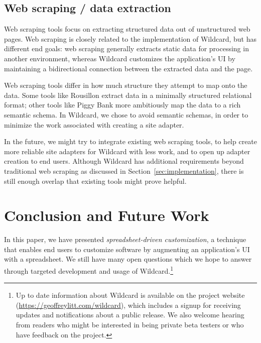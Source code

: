 \documentclass[english]{programming}
\begin{document}
\hypertarget{web-scraping-data-extraction}{%
\subsection{Web scraping / data
extraction}\label{web-scraping-data-extraction}}

Web scraping tools focus on extracting structured data out of
unstructured web pages. Web scraping is closely related to the
implementation of Wildcard, but has different end goals: web scraping
generally extracts static data for processing in another environment,
whereas Wildcard customizes the application's UI by maintaining a
bidirectional connection between the extracted data and the page.

Web scraping tools differ in how much structure they attempt to map onto
the data. Some tools like Rousillon \autocite{chasins2018} extract data
in a minimally structured relational format; other tools like Piggy Bank
\autocite{huynh2005} more ambitiously map the data to a rich semantic
schema. In Wildcard, we chose to avoid semantic schemas, in order to
minimize the work associated with creating a site adapter.

In the future, we might try to integrate existing web scraping tools, to
help create more reliable site adapters for Wildcard with less work, and
to open up adapter creation to end users. Although Wildcard has
additional requirements beyond traditional web scraping as discussed in
Section~\ref{sec:implementation}, there is still enough overlap that
existing tools might prove helpful.

\hypertarget{sec:conclusion}{%
\section{Conclusion and Future Work}\label{sec:conclusion}}

In this paper, we have presented \emph{spreadsheet-driven
customization}, a technique that enables end users to customize software
by augmenting an application's UI with a spreadsheet. We still have many
open questions which we hope to answer through targeted development and
usage of Wildcard.{\footnote{Up to date information about Wildcard is
  available on the project website
  (\url{https://geoffreylitt.com/wildcard}), which includes a signup for
  receiving updates and notifications about a public release. We also
  welcome hearing from readers who might be interested in being private
  beta testers or who have feedback on the project.}}
\end{document}
